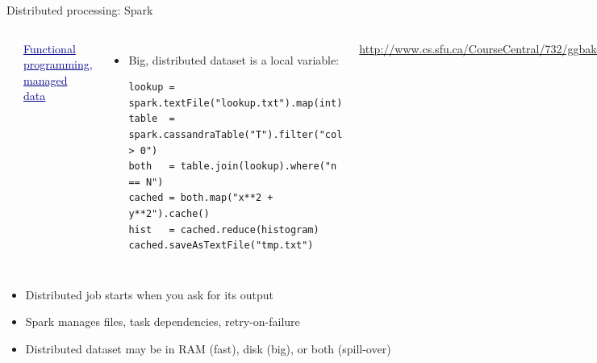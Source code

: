 \documentclass[aspectratio=169]{beamer}
\begin{document}
\begin{frame}[fragile]{Distributed processing: Spark}
\vspace{0.5 cm}
\begin{columns}[b]
\includegraphics[height=1.5 cm]{spark-logo.png}

\textcolor{darkblue}{\Large \underline{Functional programming, managed data}}

\large
\vspace{0.25 cm}
\begin{itemize}
\item Big, distributed dataset is a local variable:

\scriptsize
\begin{verbatim}
lookup = spark.textFile("lookup.txt").map(int)
table  = spark.cassandraTable("T").filter("col > 0")
both   = table.join(lookup).where("n == N")
cached = both.map("x**2 + y**2").cache()
hist   = cached.reduce(histogram)
cached.saveAsTextFile("tmp.txt")
\end{verbatim}
\end{itemize}

\tiny

\textcolor{blue}{\url{http://www.cs.sfu.ca/CourseCentral/732/ggbaker/content/spark.html}}

\vspace{0.2 cm}
\includegraphics[width=\linewidth]{spark-dag.png}
\end{columns}

\large
\begin{itemize}
\item Distributed job starts when you ask for its output
\item Spark manages files, task dependencies, retry-on-failure
\item Distributed dataset may be in RAM (fast), disk (big), or both (spill-over)
\end{itemize}
\end{frame}
\end{document}
